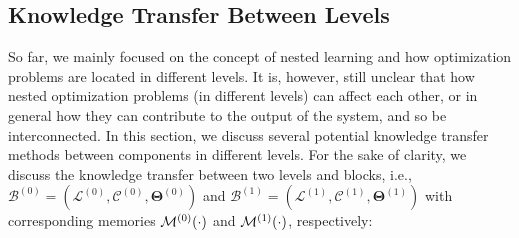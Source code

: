  
\subsection{Knowledge Transfer Between Levels}\label{sec:knowledge-transfer}
So far, we mainly focused on the concept of nested learning and how optimization problems are located in different levels. It is, however, still unclear that how nested optimization problems (in different levels) can affect each other, or in general how they can contribute to the output of the system, and so be interconnected. In this section, we discuss several potential knowledge transfer methods between components in different levels. For the sake of clarity, we discuss the knowledge transfer between two levels and blocks, i.e., $\mathcal{B}^{(0)} = (\mathcal{L}^{(0)}, \mathcal{C}^{(0)}, \boldsymbol{\Theta}^{(0)})$ and $\mathcal{B}^{(1)} = (\mathcal{L}^{(1)}, \mathcal{C}^{(1)}, \boldsymbol{\Theta}^{(1)})$ with corresponding memories $\mathcal{M}^{(0)}(\cdot)$ and $\mathcal{M}^{(1)}(\cdot)$, respectively:


